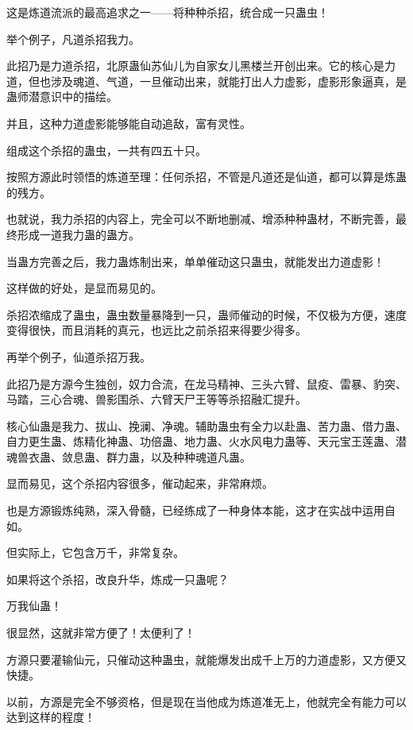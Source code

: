 
\begin{this_body}



这是炼道流派的最高追求之一——将种种杀招，统合成一只蛊虫！

举个例子，凡道杀招我力。

此招乃是力道杀招，北原蛊仙苏仙儿为自家女儿黑楼兰开创出来。它的核心是力道，但也涉及魂道、气道，一旦催动出来，就能打出人力虚影，虚影形象逼真，是蛊师潜意识中的描绘。

并且，这种力道虚影能够能自动追敌，富有灵性。

组成这个杀招的蛊虫，一共有四五十只。

按照方源此时领悟的炼道至理：任何杀招，不管是凡道还是仙道，都可以算是炼蛊的残方。

也就说，我力杀招的内容上，完全可以不断地删减、增添种种蛊材，不断完善，最终形成一道我力蛊的蛊方。

当蛊方完善之后，我力蛊炼制出来，单单催动这只蛊虫，就能发出力道虚影！

这样做的好处，是显而易见的。

杀招浓缩成了蛊虫，蛊虫数量暴降到一只，蛊师催动的时候，不仅极为方便，速度变得很快，而且消耗的真元，也远比之前杀招来得要少得多。

再举个例子，仙道杀招万我。

此招乃是方源今生独创，奴力合流，在龙马精神、三头六臂、鼠疫、雷暴、豹突、马踏，三心合魂、兽影围杀、六臂天尸王等等杀招融汇提升。

核心仙蛊是我力、拔山、挽澜、净魂。辅助蛊虫有全力以赴蛊、苦力蛊、借力蛊、自力更生蛊、炼精化神蛊、功倍蛊、地力蛊、火水风电力蛊等、天元宝王莲蛊、潜魂兽衣蛊、敛息蛊、群力蛊，以及种种魂道凡蛊。

显而易见，这个杀招内容很多，催动起来，非常麻烦。

也是方源锻炼纯熟，深入骨髓，已经练成了一种身体本能，这才在实战中运用自如。

但实际上，它包含万千，非常复杂。

如果将这个杀招，改良升华，炼成一只蛊呢？

万我仙蛊！

很显然，这就非常方便了！太便利了！

方源只要灌输仙元，只催动这种蛊虫，就能爆发出成千上万的力道虚影，又方便又快捷。

以前，方源是完全不够资格，但是现在当他成为炼道准无上，他就完全有能力可以达到这样的程度！


\end{this_body}
